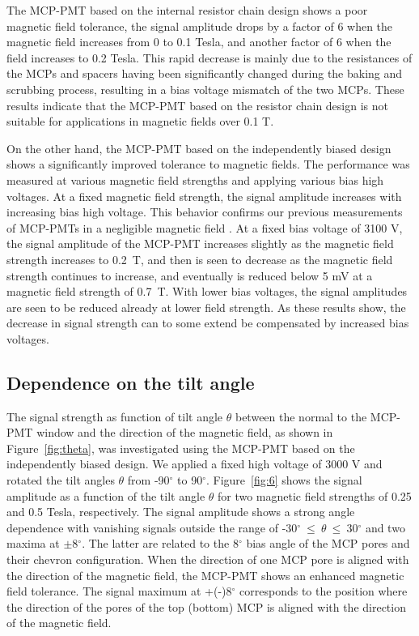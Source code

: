 \documentclass[preprint,5p]{elsarticle}
\begin{document}
The MCP-PMT based on the internal resistor chain design shows a poor magnetic 
field tolerance, the signal amplitude drops by a factor of 6 when the magnetic 
field increases from 0 to 0.1 Tesla, and another factor of 6 when the 
field increases to 0.2 Tesla. This rapid decrease is mainly due to the resistances 
of the MCPs and spacers having been significantly changed during the baking and 
scrubbing process, resulting in a bias voltage mismatch of the two MCPs. 
These results indicate that the MCP-PMT based on the 
resistor chain design is not suitable for applications in magnetic fields over 0.1 T. 

On the other hand, the MCP-PMT based on the independently biased design shows 
a significantly improved tolerance to magnetic fields. The performance was measured
at various magnetic field strengths and applying various bias high voltages. 
At a fixed magnetic field strength, the 
signal amplitude increases with increasing bias high voltage. 
This behavior confirms our previous measurements of MCP-PMTs in a
negligible magnetic field \cite{21}. At a fixed bias voltage of 3100 V, 
the signal amplitude of the MCP-PMT increases slightly as the magnetic field 
strength increases to 0.2~T, and then is seen to decrease as the magnetic field strength 
continues to increase, and eventually is reduced below 5 
mV at a magnetic field strength of 0.7~T. With lower bias voltages, the signal amplitudes are
seen to be reduced already at lower field strength. 
As these results show, the decrease in signal strength can to some extend be compensated by
increased bias voltages.

\subsection{Dependence on the tilt angle} \label{}
The signal strength as function of tilt angle $\theta$  between the normal to the MCP-PMT window and the direction of the 
magnetic field, as shown in Figure~\ref{fig:theta}, was investigated using the MCP-PMT based on the independently 
biased design.
We applied a fixed high 
voltage of 3000 V and rotated the tilt angles $\theta$ from 
-90$^{\circ}$ to 90$^{\circ}$.  
Figure~\ref{fig:6} shows the signal amplitude as a function of the tilt angle $\theta$ for two magnetic 
field strengths of 0.25 and 0.5 Tesla, respectively.  The signal amplitude 
shows a strong angle dependence with vanishing signals outside the range of -30$^{\circ}~\leq~\theta~\leq~$30$^{\circ}$ 
and two maxima at $\pm$8$^{\circ}$. 
The latter are related to the 8$^{\circ}$ bias angle of the MCP pores 
and their chevron configuration.  When the direction of one MCP pore is aligned 
with the direction of the magnetic field, the MCP-PMT shows an enhanced 
magnetic field tolerance. The signal maximum at +(-)8$^{\circ}$ corresponds to the 
position where the direction of the pores of the top (bottom) MCP is aligned with the direction of 
the magnetic field.
\end{document}
